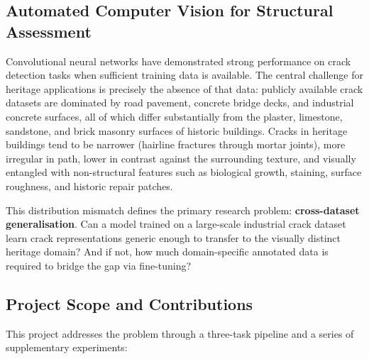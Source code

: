 \documentclass[12pt,a4paper]{article}
\begin{document}
\subsection{Automated Computer Vision for Structural Assessment}

Convolutional neural networks have demonstrated strong performance on crack detection tasks when sufficient training data is available. The central challenge for heritage applications is precisely the absence of that data: publicly available crack datasets are dominated by road pavement, concrete bridge decks, and industrial concrete surfaces, all of which differ substantially from the plaster, limestone, sandstone, and brick masonry surfaces of historic buildings. Cracks in heritage buildings tend to be narrower (hairline fractures through mortar joints), more irregular in path, lower in contrast against the surrounding texture, and visually entangled with non-structural features such as biological growth, staining, surface roughness, and historic repair patches.

This distribution mismatch defines the primary research problem: \textbf{cross-dataset generalisation}. Can a model trained on a large-scale industrial crack dataset learn crack representations generic enough to transfer to the visually distinct heritage domain? And if not, how much domain-specific annotated data is required to bridge the gap via fine-tuning?

\subsection{Project Scope and Contributions}

This project addresses the problem through a three-task pipeline and a series of supplementary experiments:
\end{document}
